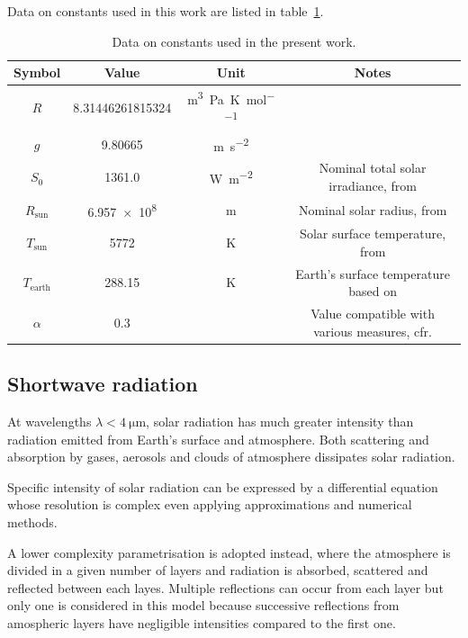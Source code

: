 \documentclass[a4paper,10pt,final,twocolumn]{article}
\begin{document}
Data on constants used in this work are listed in table~\ref{tab:constants}.
\begin{table}[h]
  \centering
  \caption{Data on constants used in the present work.}
  \label{tab:constants}
  \begin{tabular}[b]{cccc}
    \toprule
    Symbol           & Value                  & Unit                                           & Notes \\
    \midrule
    $R$              & \num{8.31446261815324} & \unit{\cubic\metre\pascal\per\kelvin\per\mole} &       \\
    $g$              & \num{9.80665}          & \unit{\metre\per\square\second}                &       \\
    $S_0$            & \num{1361.0}             & \unit{\watt\per\square\metre}                  & Nominal total solar irradiance, from \cite{IAU} \\
    $R_\text{sun}$ & \num{6.957e8}          & \unit{\metre}                                  & Nominal solar radius, from \cite{IAU} \\
    $T_\text{sun}$ & \num{5772} & \unit{\kelvin} & Solar surface temperature, from \cite{IAU} \\
    $T_\text{earth}$ & \num{288.15} & \unit{\kelvin} & Earth's surface temperature based on \cite{ISA} \\
    $\alpha$ & 0.3 & & Value compatible with various measures, cfr. \cite{albedo} \\
    \bottomrule
  \end{tabular}
\end{table}



\subsection{Shortwave radiation}
At wavelengths $\lambda < \qty{4}{\micro\metre}$, solar radiation has much greater intensity than radiation emitted from Earth's surface and atmosphere. Both scattering and absorption by gases, aerosols and clouds of atmosphere dissipates solar radiation.\cite[469]{ramanathan}

Specific intensity of solar radiation can be expressed by a differential equation whose resolution is complex even applying approximations and numerical methods.\cite[469]{ramanathan}

A lower complexity parametrisation is adopted instead, where the atmosphere is divided in a given number of layers and radiation is absorbed, scattered and reflected between each layes. Multiple reflections can occur from each layer but only one is considered in this model because successive reflections from amospheric layers have negligible intensities compared to the first one.\cite[470]{ramanathan}
\end{document}
